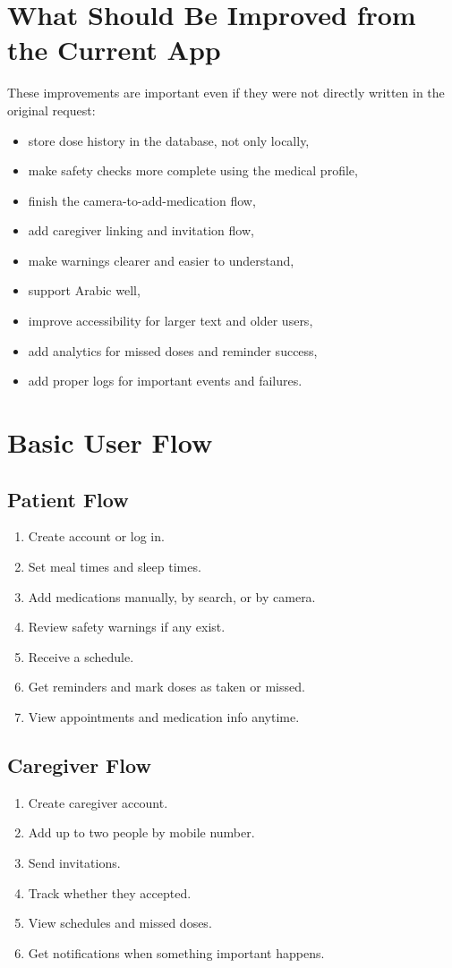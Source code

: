 \documentclass[11pt,a4paper]{article}
\begin{document}
\section{What Should Be Improved from the Current App}
These improvements are important even if they were not directly written in the original request:
\begin{itemize}
    \item store dose history in the database, not only locally,
    \item make safety checks more complete using the medical profile,
    \item finish the camera-to-add-medication flow,
    \item add caregiver linking and invitation flow,
    \item make warnings clearer and easier to understand,
    \item support Arabic well,
    \item improve accessibility for larger text and older users,
    \item add analytics for missed doses and reminder success,
    \item add proper logs for important events and failures.
\end{itemize}

\section{Basic User Flow}

\subsection{Patient Flow}
\begin{enumerate}
    \item Create account or log in.
    \item Set meal times and sleep times.
    \item Add medications manually, by search, or by camera.
    \item Review safety warnings if any exist.
    \item Receive a schedule.
    \item Get reminders and mark doses as taken or missed.
    \item View appointments and medication info anytime.
\end{enumerate}

\subsection{Caregiver Flow}
\begin{enumerate}
    \item Create caregiver account.
    \item Add up to two people by mobile number.
    \item Send invitations.
    \item Track whether they accepted.
    \item View schedules and missed doses.
    \item Get notifications when something important happens.
\end{enumerate}
\end{document}
